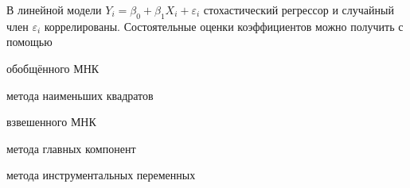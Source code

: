 
\begin{question}
В линейной модели \(Y_i = \beta_0 + \beta_1 X_i + \varepsilon_i\)
стохастический регрессор и случайный член \(\varepsilon_i\)
коррелированы. Состоятельные оценки коэффициентов можно получить с
помощью
\begin{answerlist}
  \item обобщённого МНК
  \item метода наименьших квадратов
  \item взвешенного МНК
  \item метода главных компонент
  \item метода инструментальных переменных
\end{answerlist}
\end{question}


